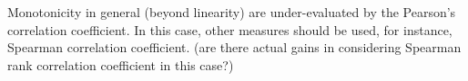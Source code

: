 Monotonicity in general (beyond linearity) are under-evaluated by the Pearson's correlation coefficient. In this case, other measures should be used, for instance, Spearman correlation coefficient. (are there actual gains in considering Spearman rank correlation coefficient in this case?)

%
%
